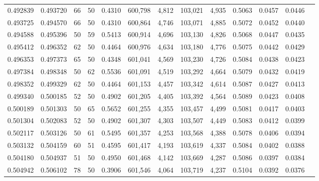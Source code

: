 \begin{tabular}{rrrrrrrrrrrrr}
0.492839 & 0.493720 &    66 &  50 &                                     0.4310 & 600,798 &   4,812 & 103,021 &   4,935 & 0.5063 & 0.0457 & 0.0446 \\
0.493725 & 0.494570 &    66 &  50 &                                     0.4310 & 600,864 &   4,746 & 103,071 &   4,885 & 0.5072 & 0.0452 & 0.0440 \\
0.494588 & 0.495396 &    50 &  59 &                                     0.5413 & 600,914 &   4,696 & 103,130 &   4,826 & 0.5068 & 0.0447 & 0.0435 \\
0.495412 & 0.496352 &    62 &  50 &                                     0.4464 & 600,976 &   4,634 & 103,180 &   4,776 & 0.5075 & 0.0442 & 0.0429 \\
0.496353 & 0.497373 &    65 &  50 &                                     0.4348 & 601,041 &   4,569 & 103,230 &   4,726 & 0.5084 & 0.0438 & 0.0423 \\
0.497384 & 0.498348 &    50 &  62 &                                     0.5536 & 601,091 &   4,519 & 103,292 &   4,664 & 0.5079 & 0.0432 & 0.0419 \\
0.498352 & 0.499329 &    62 &  50 &                                     0.4464 & 601,153 &   4,457 & 103,342 &   4,614 & 0.5087 & 0.0427 & 0.0413 \\
0.499340 & 0.500185 &    52 &  50 &                                     0.4902 & 601,205 &   4,405 & 103,392 &   4,564 & 0.5089 & 0.0423 & 0.0408 \\
0.500189 & 0.501303 &    50 &  65 &                                     0.5652 & 601,255 &   4,355 & 103,457 &   4,499 & 0.5081 & 0.0417 & 0.0403 \\
0.501304 & 0.502083 &    52 &  50 &                                     0.4902 & 601,307 &   4,303 & 103,507 &   4,449 & 0.5083 & 0.0412 & 0.0399 \\
0.502117 & 0.503126 &    50 &  61 &                                     0.5495 & 601,357 &   4,253 & 103,568 &   4,388 & 0.5078 & 0.0406 & 0.0394 \\
0.503132 & 0.504159 &    60 &  51 &                                     0.4595 & 601,417 &   4,193 & 103,619 &   4,337 & 0.5084 & 0.0402 & 0.0388 \\
0.504180 & 0.504937 &    51 &  50 &                                     0.4950 & 601,468 &   4,142 & 103,669 &   4,287 & 0.5086 & 0.0397 & 0.0384 \\
0.504942 & 0.506102 &    78 &  50 &                                     0.3906 & 601,546 &   4,064 & 103,719 &   4,237 & 0.5104 & 0.0392 & 0.0376 \\

\end{tabular}
